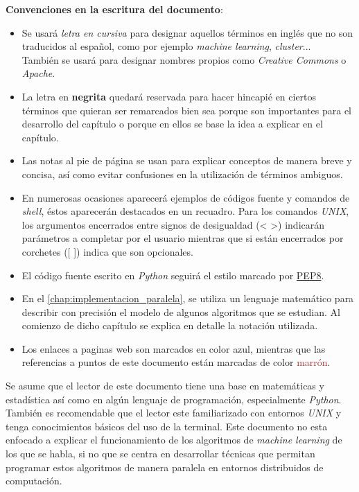 \noindent \textbf{Convenciones en la escritura del documento}:
\begin{itemize}
  \item Se usará \textit{letra en cursiva} para designar aquellos términos en inglés que no son 
        traducidos al español, como por ejemplo \textit{machine learning}, \textit{cluster}...\\
        También se usará para designar nombres propios como \textit{Creative Commons} o \textit{Apache}.
  \item La letra en \textbf{negrita} quedará reservada para hacer hincapié en ciertos términos que 
        quieran ser remarcados bien sea porque son importantes para el desarrollo del capítulo 
        o porque en ellos se base la idea a explicar en el capítulo.
  \item Las notas al pie de página se usan para explicar conceptos de manera breve y concisa, 
        así como evitar confusiones en la utilización de términos ambiguos.
  \item En numerosas ocasiones aparecerá ejemplos de códigos fuente y comandos de \textit{shell}, 
        éstos aparecerán destacados en un recuadro. Para los comandos \textit{UNIX}, los argumentos encerrados 
        entre signos de desigualdad (< >) indicarán parámetros a completar por el usuario mientras que 
        si están encerrados por corchetes ([ ]) indica que son opcionales.
  \item El código fuente escrito en \textit{Python} seguirá el estilo marcado por 
        \href{https://www.python.org/dev/peps/pep-0008/}{PEP8}.
  \item En el \autoref{chap:implementacion_paralela}, se utiliza un lenguaje matemático para describir 
        con precisión el modelo de algunos algoritmos que se estudian. Al comienzo de dicho capítulo 
        se explica en detalle la notación utilizada.
  \item Los enlaces a paginas web son marcados en color \textcolor{blue!80!black}{azul}, mientras que 
        las referencias a puntos de este documento están marcadas de color %
        \textcolor{Brown}{marrón}.
\end{itemize}

\vspace*{0.5cm}

\noindent Se asume que el lector de este documento tiene una base en matemáticas y estadística así como en algún 
lenguaje de programación, especialmente \textit{Python}. También es recomendable que el lector este
familiarizado con entornos \textit{UNIX} y tenga conocimientos básicos del uso de la terminal.
Este documento no esta enfocado a explicar el funcionamiento de los algoritmos de \textit{machine learning} 
de los que se habla, si no que se centra en desarrollar técnicas que permitan programar estos algoritmos 
de manera paralela en entornos distribuidos de computación.
\newline

